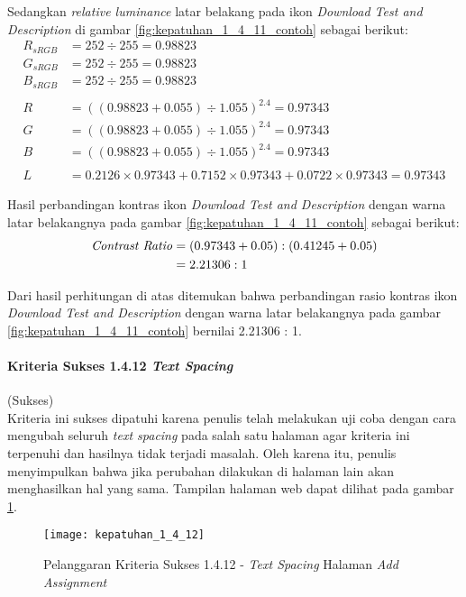 Sedangkan \textit{relative luminance} latar belakang pada ikon \textit{Download Test and Description} di gambar \ref{fig:kepatuhan_1_4_11_contoh} sebagai berikut:
\begin{align*}
	R_{sRGB} &= 252 \div 255 = 0.98823 \\
	G_{sRGB} &= 252 \div 255 = 0.98823 \\
	B_{sRGB} &= 252 \div 255 = 0.98823 \\
	\\
	R &= ((0.98823 + 0.055) \div 1.055)^{2.4} = 0.97343 \\
	G &= ((0.98823 + 0.055) \div 1.055)^{2.4} = 0.97343 \\
	B &= ((0.98823 + 0.055) \div 1.055)^{2.4} = 0.97343 \\
	\\
	L &= 0.2126 \times 0.97343 + 0.7152 \times 0.97343 + 0.0722 \times 0.97343 = 0.97343
\end{align*}

Hasil perbandingan kontras ikon \textit{Download Test and Description} dengan warna latar belakangnya pada gambar \ref{fig:kepatuhan_1_4_11_contoh} sebagai berikut:
\begin{align*}
	\text{\textit{Contrast Ratio}} &= (0.97343 + 0.05) : (0.41245 +0.05) \\
	&= 2.21306 : 1
\end{align*}

Dari hasil perhitungan di atas ditemukan bahwa perbandingan rasio kontras ikon \textit{Download Test and Description} dengan warna latar belakangnya pada gambar \ref{fig:kepatuhan_1_4_11_contoh} bernilai 2.21306 : 1.

\paragraph{Kriteria Sukses 1.4.12 \textit{Text Spacing}}
\label{subsubsec:kepatuhan_kriteria_1.4.12}
(Sukses) \\

Kriteria ini sukses dipatuhi karena penulis telah melakukan uji coba dengan cara mengubah seluruh \textit{text spacing} pada salah satu halaman agar kriteria ini terpenuhi dan hasilnya tidak terjadi masalah. Oleh karena itu, penulis menyimpulkan bahwa jika perubahan dilakukan di halaman lain akan menghasilkan hal yang sama. Tampilan halaman web dapat dilihat pada gambar \ref{fig:kepatuhan_1_4_12}.
\begin{figure}[H]
	\centering  
	\texttt{[image: kepatuhan\_1\_4\_12]}  
	\caption[Pelanggaran Kriteria Sukses 1.4.12 - \textit{Text Spacing} Halaman \textit{Add Assignment}]{Pelanggaran Kriteria Sukses 1.4.12 - \textit{Text Spacing} Halaman \textit{Add Assignment}} 
	\label{fig:kepatuhan_1_4_12} 
\end{figure}

